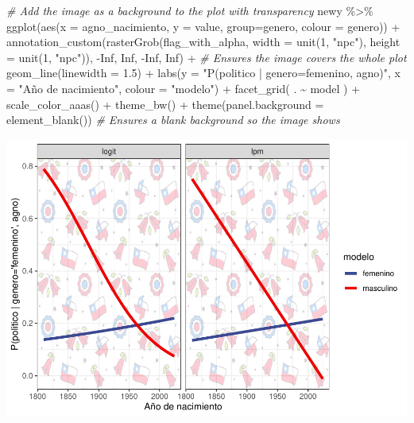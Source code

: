 \documentclass[
  12pt,
  a4paper,
]{article}
\newenvironment{Shaded}{\begin{snugshade}}{\end{snugshade}}
\newcommand{\AttributeTok}[1]{\textcolor[rgb]{0.77,0.63,0.00}{#1}}
\newcommand{\CommentTok}[1]{\textcolor[rgb]{0.56,0.35,0.01}{\textit{#1}}}
\newcommand{\ConstantTok}[1]{\textcolor[rgb]{0.00,0.00,0.00}{#1}}
\newcommand{\DecValTok}[1]{\textcolor[rgb]{0.00,0.00,0.81}{#1}}
\newcommand{\FloatTok}[1]{\textcolor[rgb]{0.00,0.00,0.81}{#1}}
\newcommand{\FunctionTok}[1]{\textcolor[rgb]{0.00,0.00,0.00}{#1}}
\newcommand{\NormalTok}[1]{#1}
\newcommand{\SpecialCharTok}[1]{\textcolor[rgb]{0.00,0.00,0.00}{#1}}
\newcommand{\StringTok}[1]{\textcolor[rgb]{0.31,0.60,0.02}{#1}}
\begin{document}
\begin{Shaded}
\begin{Highlighting}[]
\CommentTok{\# Add the image as a background to the plot with transparency}
\NormalTok{newy }\SpecialCharTok{\%\textgreater{}\%} \FunctionTok{ggplot}\NormalTok{(}\FunctionTok{aes}\NormalTok{(}\AttributeTok{x =}\NormalTok{ agno\_nacimiento, }\AttributeTok{y =}\NormalTok{ value, }\AttributeTok{group=}\NormalTok{genero, }\AttributeTok{colour =}\NormalTok{ genero)) }\SpecialCharTok{+}
  \FunctionTok{annotation\_custom}\NormalTok{(}\FunctionTok{rasterGrob}\NormalTok{(flag\_with\_alpha, }
                               \AttributeTok{width =} \FunctionTok{unit}\NormalTok{(}\DecValTok{1}\NormalTok{, }\StringTok{"npc"}\NormalTok{), }
                               \AttributeTok{height =} \FunctionTok{unit}\NormalTok{(}\DecValTok{1}\NormalTok{, }\StringTok{"npc"}\NormalTok{)),}
                    \SpecialCharTok{{-}}\ConstantTok{Inf}\NormalTok{, }\ConstantTok{Inf}\NormalTok{, }\SpecialCharTok{{-}}\ConstantTok{Inf}\NormalTok{, }\ConstantTok{Inf}\NormalTok{) }\SpecialCharTok{+} \CommentTok{\# Ensures the image covers the whole plot}
  \FunctionTok{geom\_line}\NormalTok{(}\AttributeTok{linewidth =} \FloatTok{1.5}\NormalTok{) }\SpecialCharTok{+}
  \FunctionTok{labs}\NormalTok{(}\AttributeTok{y =} \StringTok{"P(politico | genero=\textquotesingle{}femenino\textquotesingle{}, agno)"}\NormalTok{, }\AttributeTok{x =} \StringTok{"Año de nacimiento"}\NormalTok{, }\AttributeTok{colour =} \StringTok{"modelo"}\NormalTok{) }\SpecialCharTok{+}
  \FunctionTok{facet\_grid}\NormalTok{( . }\SpecialCharTok{\textasciitilde{}}\NormalTok{ model ) }\SpecialCharTok{+}
  \FunctionTok{scale\_color\_aaas}\NormalTok{() }\SpecialCharTok{+} 
  \FunctionTok{theme\_bw}\NormalTok{() }\SpecialCharTok{+}
  \FunctionTok{theme}\NormalTok{(}\AttributeTok{panel.background =} \FunctionTok{element\_blank}\NormalTok{()) }\CommentTok{\# Ensures a blank background so the image shows}
\end{Highlighting}
\end{Shaded}

\includegraphics[width=0.8\linewidth]{01-trabajo-alaffert_files/figure-latex/unnamed-chunk-8-1}
\end{document}

